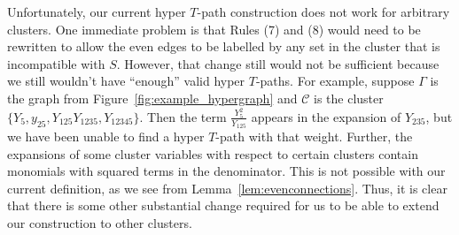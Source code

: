\documentclass[10pt,a4paper]{amsart}
\numberwithin{equation}{section}
\begin{document}
Unfortunately, our current hyper $T$-path construction does not work for arbitrary clusters. One immediate problem is that Rules (7) and (8) would need to be rewritten to allow the even edges to be labelled by any set in the cluster that is incompatible with $S$. However, that change still would not be sufficient because we still wouldn't have ``enough'' valid hyper $T$-paths. For example, suppose $\Gamma$ is the graph from Figure~\ref{fig:example_hypergraph} and $\mathcal{C}$ is the cluster $\{Y_5,y_{25},Y_{125}Y_{1235},Y_{12345}\}$. Then the term $\frac{Y_5^2}{Y_{125}}$ appears in the expansion of $Y_{235}$, but we have been unable to find a hyper $T$-path with that weight. Further, the expansions of some cluster variables with respect to certain clusters contain monomials with squared terms in the denominator. This is not possible with our current definition, as we see from Lemma~\ref{lem:evenconnections}. Thus, it is clear that there is some other substantial change required for us to be able to extend our construction to other clusters.
\end{document}

